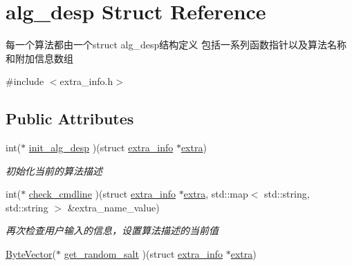 \hypertarget{structalg__desp}{}\section{alg\+\_\+desp Struct Reference}
\label{structalg__desp}


每一个算法都由一个struct alg\+\_\+desp结构定义 包括一系列函数指针以及算法名称和附加信息数组  




{\ttfamily \#include $<$extra\+\_\+info.\+h$>$}

\subsection*{Public Attributes}
\begin{DoxyCompactItemize}
\item 
\mbox{\label{structalg__desp_a79af5fe8dd1b7cda16e9483eb66ad092}} 
int($\ast$ \mbox{\hyperlink{structalg__desp_a79af5fe8dd1b7cda16e9483eb66ad092}{init\+\_\+alg\+\_\+desp}} )(struct \mbox{\hyperlink{structextra__info}{extra\+\_\+info}} $\ast$\mbox{\hyperlink{structalg__desp_a02eb817495fc1d08be8f4dbe1769f9e5}{extra}})
\begin{DoxyCompactList}\small\item\em 初始化当前的算法描述 \end{DoxyCompactList}\item 
\mbox{\label{structalg__desp_a9c573b1f5fd0f941cc3a0bdc5836fe29}} 
int($\ast$ \mbox{\hyperlink{structalg__desp_a9c573b1f5fd0f941cc3a0bdc5836fe29}{check\+\_\+cmdline}} )(struct \mbox{\hyperlink{structextra__info}{extra\+\_\+info}} $\ast$\mbox{\hyperlink{structalg__desp_a02eb817495fc1d08be8f4dbe1769f9e5}{extra}}, std\+::map$<$ std\+::string, std\+::string $>$ \&extra\+\_\+name\+\_\+value)
\begin{DoxyCompactList}\small\item\em 再次检查用户输入的信息，设置算法描述的当前值 \end{DoxyCompactList}\item 
\mbox{\label{structalg__desp_ad55f8d88a8afb883af6bebd7fa0ced47}} 
\mbox{\hyperlink{class_byte_vector}{Byte\+Vector}}($\ast$ \mbox{\hyperlink{structalg__desp_ad55f8d88a8afb883af6bebd7fa0ced47}{get\+\_\+random\+\_\+salt}} )(struct \mbox{\hyperlink{structextra__info}{extra\+\_\+info}} $\ast$\mbox{\hyperlink{structalg__desp_a02eb817495fc1d08be8f4dbe1769f9e5}{extra}})

\end{DoxyCompactItemize}
